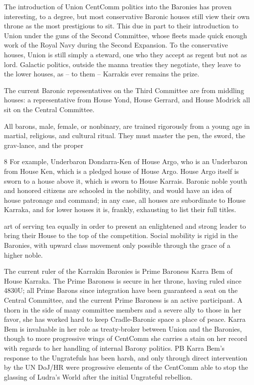 The introduction of Union CentComm politics into the Baronies has proven interesting, to a
degree, but most conservative Baronic houses still view their own throne as the most prestigious
to sit. This due in part to their introduction to Union under the guns of the Second Committee,
whose fleets made quick enough work of the Royal Navy during the Second Expansion. To the
conservative houses, Union is still simply a steward, one who they accept as regent but not as
lord. Galactic politics, outside the manna treaties they negotiate, they leave to the lower houses,
as -- to them -- Karrakis ever remains the prize.


The current Baronic representatives on the Third Committee are from middling houses: a
representative from House Yond, House Gerrard, and House Modrick all sit on the Central
Committee.


All barons, male, female, or nonbinary, are trained rigorously from a young age in martial,
religious, and cultural ritual. They must master the pen, the sword, the grav-lance, and the proper

8 For example, Underbaron Dondarra-Ken of House Argo, who is an Underbaron from House Ken, which is
a pledged house of House Argo. House Argo itself is sworn to a house above it, which is sworn to House
Karrais. Baronic noble youth and honored citizens are schooled in the nobility, and would have an idea of
house patronage and command; in any case, all houses are subordinate to House Karraka, and for lower
houses it is, frankly, exhausting to list their full titles.




art of serving tea equally in order to present an enlightened and strong leader to bring their
House to the top of the competition. Social mobility is rigid in the Baronies, with upward class
movement only possible through the grace of a higher noble.


The current ruler of the Karrakin Baronies is Prime Baroness Karra Bem of House Karraka. The
Prime Baroness is secure in her throne, having ruled since 4830U; all Prime Barons since
integration have been guaranteed a seat on the Central Committee, and the current Prime
Baroness is an active participant. A thorn in the side of many committee members and a severe
ally to those in her favor, she has worked hard to keep Cradle-Baronic space a place of peace.
Karra Bem is invaluable in her role as treaty-broker between Union and the Baronies, though to
more progressive wings of CentComm she carries a stain on her record with regards to her
handling of internal Barony politics. PB Karra Bem’s response to the Ungratefuls has been harsh,
and only through direct intervention by the UN DoJ/HR were progressive elements of the
CentComm able to stop the glassing of Ludra’s World after the initial Ungrateful rebellion.


